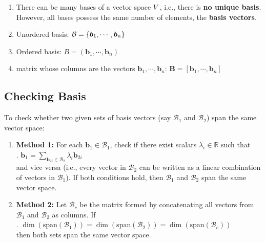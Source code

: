 \begin{enumerate}
    \item There can be many bases of a vector space $V$ , i.e., there is \textbf{no unique basis}. 
    However, all bases possess the same number of elements, the \textbf{basis vectors}. 
    \hfill \cite{mfml/book/mml/Deisenroth-Faisal-Ong}

    \item Unordered basis: $\mathcal{B} = \left\{\bm{b}_1, \cdots, \bm{b}_n\right\}$
    \hfill \cite{mfml/book/mml/Deisenroth-Faisal-Ong}

    \item Ordered basis: $B = (\bm{b}_1, \cdots, \bm{b}_n)$
    \hfill \cite{mfml/book/mml/Deisenroth-Faisal-Ong}

    \item matrix whose columns are the vectors $\bm{b}_1, \cdots, \bm{b}_n$: $\bm{B} = [\bm{b}_1, \cdots, \bm{b}_n]$
    \hfill \cite{mfml/book/mml/Deisenroth-Faisal-Ong}
\end{enumerate}


\subsection{Checking Basis}

To check whether two given sets of basis vectors (say $\mathcal{B}_1$ and $\mathcal{B}_2$) span the same vector space: 
\hfill \cite{common/online/chatgpt}
\begin{enumerate}
    \item \textbf{Method 1:} For each $\mathbf{b}_1 \in \mathcal{B}_1$, check if there exist scalars $\lambda_i \in \mathbb{R}$ such that
    \hfill \cite{common/online/chatgpt}
    \\
    .\hfill
    $
        \mathbf{b}_1 = \sum_{\mathbf{b}_{2i} \in \mathcal{B}_2} \lambda_i \mathbf{b}_{2i}
    $ 
    \hfill \cite{common/online/chatgpt}
    \\
    and vice versa (i.e., every vector in $\mathcal{B}_2$ can be written as a linear combination of vectors in $\mathcal{B}_1$).  
    If both conditions hold, then $\mathcal{B}_1$ and $\mathcal{B}_2$ span the same vector space.
    \hfill \cite{common/online/chatgpt}

    \item \textbf{Method 2:} Let $\mathcal{B}_c$ be the matrix formed by concatenating all vectors from $\mathcal{B}_1$ and $\mathcal{B}_2$ as columns.  
    If 
    \hfill \cite{common/online/chatgpt}
    \\
    .\hfill
    $
        \dim(\mathrm{span}(\mathcal{B}_1)) = \dim(\mathrm{span}(\mathcal{B}_2)) = \dim(\mathrm{span}(\mathcal{B}_c))
    $
    \hfill \cite{common/online/chatgpt}
    \\
    then both sets span the same vector space.
    \hfill \cite{common/online/chatgpt}
\end{enumerate}


